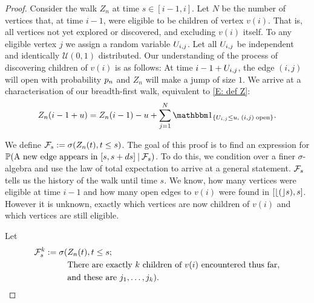 \begin{proof} \label{P: formula an}
	Consider the walk $Z_n$ at time $s\in[i-1, i]$.
	Let $N$ be the number of vertices that, at time $i-1$, were eligible to be children of vertex $v(i)$.
	That is, all vertices not yet explored or discovered, and excluding $v(i)$ itself.
	To any eligible vertex $j$ we assign a random variable $U_{i,j}$.
	Let all $U_{i,j}$ be independent and identically $\mathcal{U}(0,1)$ distributed.
	Our understanding of the process of discovering children of $v(i)$ is as follows:
	At time $i-1+U_{i,j}$, the edge $(i,j)$ will open with probability $p_n$ and
	$Z_n$ will make a jump of size $1$.
	We arrive at a characterisation of our breadth-first walk, 
	equivalent to \eqref{E: def Z}:	
	\begin{equation}
	Z_n(i-1+u) = Z_n(i-1) - u + \sum_{j=1}^{N} \Ind{\{\Uij \leq u, \; (i,j) \; \text{open}\}}.
	\end{equation}
	
	We define $\mathcal{F}_s := \sigma(Z_n(t), t\leq s)$.
	The goal of this proof is to find an expression for
	$\mathbb{P}(\text{A new edge appears in $[s, s+ds]$} \: | \: \mathcal{F}_s)$.
	To do this, we condition over a finer $\sigma$-algebra and use the law of total expectation to arrive at a general statement.
	$\mathcal{F}_s$ tells us the history of the walk until time $s$. 
	We know, how many vertices were eligible at time $i-1$ and how many open edges to $v(i)$ were found in $[\lfloor(\rfloor s),s]$.
	However it is unknown, exactly which vertices are now children of $v(i)$ and which vertices are still eligible.
	
	Let 
	\begin{equation}
	\begin{split}
	\mathcal{F}_s^k := \sigma(&Z_n(t), t\leq s; \\
	&\text{There are exactly $k$ children of $v(i)$ encountered thus far}, \\
	&\text{and these are $j_1, \dots, j_k$}).
	\end{split}
	\end{equation}
	

\end{proof}
